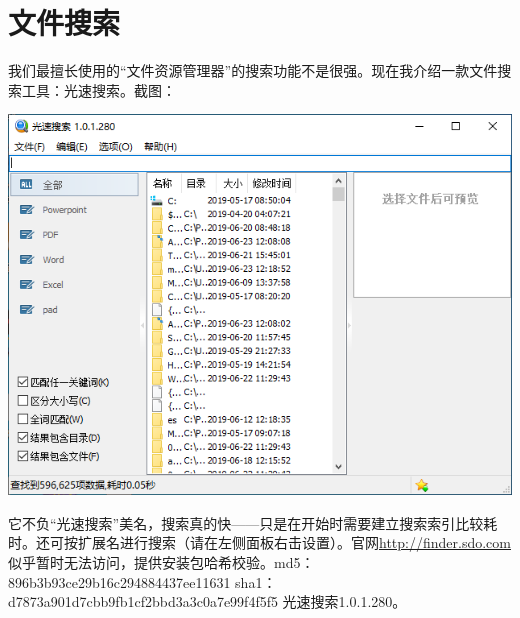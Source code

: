 \section{文件搜索}
我们最擅长使用的“文件资源管理器”的搜索功能不是很强。现在我介绍一款文件搜索工具：光速搜索。截图：
\begin{center}
	\includegraphics[scale=0.7]{pic/finder}
\end{center} \par
它不负“光速搜索”美名，搜索真的快——只是在开始时需要建立搜索索引比较耗时。还可按扩展名进行搜索（请在左侧面板右击设置）。官网\url{http://finder.sdo.com}似乎暂时无法访问，提供安装包哈希校验。md5：896b3b93ce29b16c294884437ee11631 sha1：d7873a901d7cbb9fb1cf2bbd3a3c0a7e99f4f5f5 光速搜索1.0.1.280。
